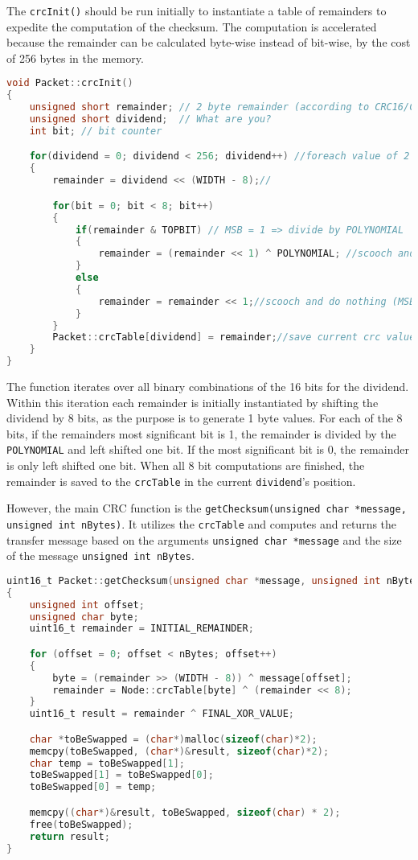 The \texttt{crcInit()} should be run initially to instantiate a table of remainders to expedite the computation of the checksum. The computation is accelerated because the remainder can be calculated byte-wise instead of bit-wise, by the cost of 256 bytes in the memory.  

\begin{lstlisting}[language=C]
void Packet::crcInit()
{
    unsigned short remainder; // 2 byte remainder (according to CRC16/CCITT standard)
    unsigned short dividend;  // What are you?
    int bit; // bit counter

    for(dividend = 0; dividend < 256; dividend++) //foreach value of 2 bytes/8 bits
    {
        remainder = dividend << (WIDTH - 8);//

        for(bit = 0; bit < 8; bit++)
        {
            if(remainder & TOPBIT) // MSB = 1 => divide by POLYNOMIAL
            {
                remainder = (remainder << 1) ^ POLYNOMIAL; //scooch and divide
            }
            else
            {
		        remainder = remainder << 1;//scooch and do nothing (MSB = 0, move along)
	        }
        }
    	Packet::crcTable[dividend] = remainder;//save current crc value in crcTable
    }
}
\end{lstlisting}

The function iterates over all binary combinations of the 16 bits for the dividend. Within this iteration each remainder is initially instantiated by shifting the dividend by 8 bits, as the purpose is to generate 1 byte values. For each of the 8 bits, if the remainders most significant bit is 1, the remainder is divided by the \texttt{POLYNOMIAL} and left shifted one bit. If the most significant bit is 0, the remainder is only left shifted one bit. When all 8 bit computations are finished, the remainder is saved to the \texttt{crcTable} in the current \texttt{dividend}'s position.

However, the main CRC function is the \texttt{getChecksum(unsigned char *message, unsigned int nBytes)}. It utilizes the \texttt{crcTable} and computes and returns the transfer message based on the arguments \texttt{unsigned char *message} and the size of the message \texttt{unsigned int nBytes}.

\begin{lstlisting}[language=C]
uint16_t Packet::getChecksum(unsigned char *message, unsigned int nBytes)
{
    unsigned int offset;
    unsigned char byte;
    uint16_t remainder = INITIAL_REMAINDER;

    for (offset = 0; offset < nBytes; offset++)
    {
        byte = (remainder >> (WIDTH - 8)) ^ message[offset];
        remainder = Node::crcTable[byte] ^ (remainder << 8);
    }
    uint16_t result = remainder ^ FINAL_XOR_VALUE;

    char *toBeSwapped = (char*)malloc(sizeof(char)*2);
    memcpy(toBeSwapped, (char*)&result, sizeof(char)*2);
    char temp = toBeSwapped[1];
    toBeSwapped[1] = toBeSwapped[0];
    toBeSwapped[0] = temp;

    memcpy((char*)&result, toBeSwapped, sizeof(char) * 2);
    free(toBeSwapped);
    return result;
}
\end{lstlisting}


